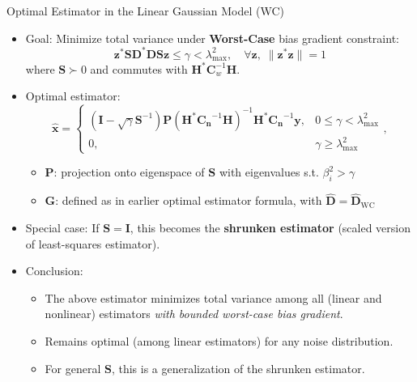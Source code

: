 \documentclass{beamer}
\begin{document}
\begin{frame}{Optimal Estimator in the Linear Gaussian Model (WC)}
\begin{itemize}
    \item Goal: Minimize total variance under \textbf{Worst-Case} bias gradient constraint:
    \vspace{-10pt}
    \[
    \mathbf{z}^{*} \mathbf{S} \mathbf{D}^{*} \mathbf{D} \mathbf{S} \mathbf{z} \leq \gamma < \lambda_{\max}^{2}, \quad \forall \mathbf{z}, \; \|\mathbf{z}^*\mathbf{z}\| = 1
    \]
    where \( \mathbf{S} \succ 0 \) and commutes with \( \mathbf{H}^{*}\mathbf{C}_{w}^{-1}\mathbf{H} \).
    \item Optimal estimator:
    \[
    \hat{\mathbf{x}} = 
    \begin{cases} 
    (\mathbf{I} - \sqrt{\gamma}\mathbf{S}^{-1})\mathbf{P}\left(\mathbf{H}^*\mathbf{C_n}^{-1}\mathbf{H}\right)^{-1}\mathbf{H}^*\mathbf{C_n}^{-1}\mathbf{y}, & 0 \leq \gamma < \lambda_{\text{max}}^2 \\ 
    0, & \gamma \geq \lambda_{\text{max}}^2 
    \end{cases},
    \]
    \begin{itemize}
        \item \(\mathbf{P}\): projection onto eigenspace of \(\mathbf{S}\) with eigenvalues s.t. \(\beta_i^2 > \gamma\)
        \item \(\mathbf{G}\): defined as in earlier optimal estimator formula, with \(\hat{\mathbf{D}} = \hat{\mathbf{D}}_{\text{WC}}\)
    \end{itemize}
    \item Special case: If \(\mathbf{S} = \mathbf{I}\), this becomes the \textbf{shrunken estimator} (scaled version of least-squares estimator).
    \item Conclusion:
    \begin{itemize}
        \item The above estimator minimizes total variance among all (linear and nonlinear) estimators \textit{with bounded worst-case bias gradient}.
        \item Remains optimal (among linear estimators) for any noise distribution.
        \item For general \(\mathbf{S}\), this is a generalization of the shrunken estimator.
    \end{itemize}
\end{itemize}
\end{frame}
\end{document}
